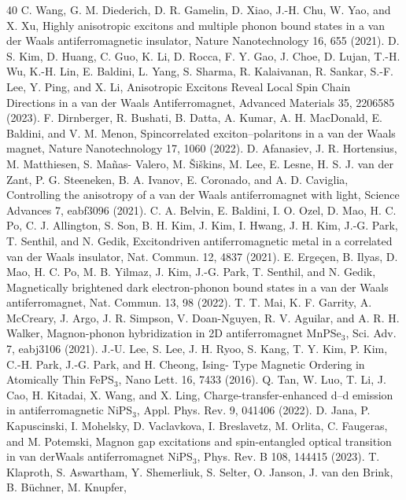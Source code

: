 \documentclass[%
 reprint,
superscriptaddress,
 amsmath,amssymb,
 aps,
]{revtex4-2}
\begin{document}
\begin{thebibliography}{40}
C. Wang, G. M. Diederich, D. R. Gamelin, D. Xiao, J.-H. Chu, W. Yao, and X. Xu, Highly anisotropic excitons
and multiple phonon bound states in a van der Waals
antiferromagnetic insulator, Nature Nanotechnology 16,
655 (2021).
D. S. Kim, D. Huang, C. Guo, K. Li, D. Rocca, F. Y.
Gao, J. Choe, D. Lujan, T.-H. Wu, K.-H. Lin, E. Baldini,
L. Yang, S. Sharma, R. Kalaivanan, R. Sankar, S.-F. Lee,
Y. Ping, and X. Li, Anisotropic Excitons Reveal Local
Spin Chain Directions in a van der Waals Antiferromagnet,
Advanced Materials 35, 2206585 (2023).
F. Dirnberger, R. Bushati, B. Datta, A. Kumar, A. H.
MacDonald, E. Baldini, and V. M. Menon, Spincorrelated
exciton–polaritons in a van der Waals magnet,
Nature Nanotechnology 17, 1060 (2022).
D. Afanasiev, J. R. Hortensius, M. Matthiesen, S. Ma\~{n}as-
Valero, M. \v{S}i\v{s}kins, M. Lee, E. Lesne, H. S. J. van der
Zant, P. G. Steeneken, B. A. Ivanov, E. Coronado, and
A. D. Caviglia, Controlling the anisotropy of a van der
Waals antiferromagnet with light, Science Advances 7,
eabf3096 (2021).
C. A. Belvin, E. Baldini, I. O. Ozel, D. Mao, H. C. Po,
C. J. Allington, S. Son, B. H. Kim, J. Kim, I. Hwang,
J. H. Kim, J.-G. Park, T. Senthil, and N. Gedik, Excitondriven
antiferromagnetic metal in a correlated van der
Waals insulator, Nat. Commun. 12, 4837 (2021).
E. Erge\c{c}en, B. Ilyas, D. Mao, H. C. Po, M. B. Yilmaz,
J. Kim, J.-G. Park, T. Senthil, and N. Gedik, Magnetically
brightened dark electron-phonon bound states in
a van der Waals antiferromagnet, Nat. Commun. 13, 98
(2022).
T. T. Mai, K. F. Garrity, A. McCreary, J. Argo, J. R.
Simpson, V. Doan-Nguyen, R. V. Aguilar, and A. R. H.
Walker, Magnon-phonon hybridization in 2D antiferromagnet
MnPSe$_3$, Sci. Adv. 7, eabj3106 (2021).
J.-U. Lee, S. Lee, J. H. Ryoo, S. Kang, T. Y. Kim,
P. Kim, C.-H. Park, J.-G. Park, and H. Cheong, Ising-
Type Magnetic Ordering in Atomically Thin FePS$_3$,
Nano Lett. 16, 7433 (2016).
Q. Tan, W. Luo, T. Li, J. Cao, H. Kitadai, X. Wang, and
X. Ling, Charge-transfer-enhanced d–d emission in antiferromagnetic
NiPS$_3$, Appl. Phys. Rev. 9, 041406 (2022).
D. Jana, P. Kapuscinski, I. Mohelsky, D. Vaclavkova,
I. Breslavetz, M. Orlita, C. Faugeras, and M. Potemski,
Magnon gap excitations and spin-entangled optical
transition in van derWaals antiferromagnet NiPS$_3$, Phys.
Rev. B 108, 144415 (2023).
T. Klaproth, S. Aswartham, Y. Shemerliuk, S. Selter, O. Janson, J. van den Brink, B. B\"{u}chner, M. Knupfer,

\end{thebibliography}
\end{document}
